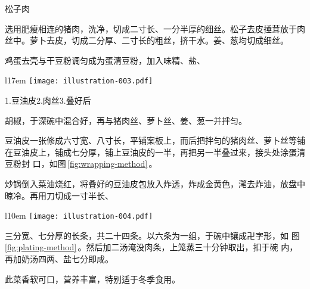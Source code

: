 \begin{recipe}{松子肉}

\ingredients


\preparation

\step 选用肥瘦相连的猪肉，洗净，切成二寸长、一分半厚的细丝。松子去皮捶茸放于肉
丝中。萝卜去皮，切成二分厚、二寸长的粗丝，挤干水。姜、葱均切成细丝。

\step 鸡蛋去壳与干豆粉调匀成为蛋清豆粉，加入味精、盐、
\begin{wrapfigure}[7]{l}{17em}%
\centering%
\vspace{-.4375\baselineskip}%
\texttt{[image: illustration-003.pdf]}%
\vspace{-.5625\baselineskip}%
\caption{松子肉包叠法}%
\label{fig:wrapping-method}%
{\small 1.豆油皮\hspace{1em}2.肉丝\hspace{1em}3.叠好后}%
\end{wrapfigure}%
胡椒，于深碗中混合好，再与猪肉丝、萝卜丝、姜、葱一并拌匀。

\step 豆油皮一张修成六寸宽、八寸长，平铺案板上，而后把拌匀的猪肉丝、萝卜丝等铺
在豆油皮上，铺成七分厚，铺上豆油皮的一半，再把另一半叠过来，接头处涂蛋清豆粉封
口，如图\,\ref{fig:wrapping-method}\,。

\step 炒锅倒入菜油烧红，将叠好的豆油皮包放入炸透，炸成金黄色，滗去炸油，放盘中
晾冷。再用刀切成一寸半长、
\begin{wrapfigure}[5]{l}{10em}%
\centering%
\vspace{-1.25\baselineskip}%
\texttt{[image: illustration-004.pdf]}%
\vspace{-.5625\baselineskip}%
\caption{松子肉摆法}%
\label{fig:plating-method}%
\end{wrapfigure}%
三分宽、七分厚的长条，共二十四条。以六条为一组，于碗中镶成卍字形，如
图\,\ref{fig:plating-method}\,。然后加二汤淹没肉条，上笼蒸三十分钟取出，扣于碗
内，再加奶汤四两、盐七分即成。

\features

此菜香软可口，营养丰富，特别适于冬季食用。

\end{recipe}

